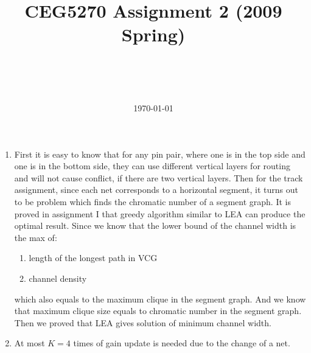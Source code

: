 \documentclass[a4paper,12pt]{article}
\title{CEG5270 Assignment 2 (2009 Spring)}
\author{\myname\\\mymail\\\CSE\\\CUHK}
\date{\today}
\begin{document}
\maketitle
\begin{enumerate}
\item
First it is easy to know that for any pin pair, where one is in the top side and one is in the bottom side,
they can use different vertical layers for routing and will not cause conflict, if there are two vertical layers.
Then for the track assignment, since each net corresponds to a horizontal segment, 
it turns out to be problem which finds the chromatic number of a segment graph.
It is proved in assignment I that greedy algorithm similar to LEA can produce the optimal result.
Since we know that the lower bound of the channel width is the max of:
	\begin{enumerate}
	\item\label{lb1}
	length of the longest path in VCG
	\item\label{lb2}
	channel density
	\end{enumerate}
which also equals to the maximum clique in the segment graph.
And we know that maximum clique size equals to chromatic number in the segment graph.
Then we proved that LEA gives solution of minimum channel width.
\item
At most $K=4$ times of gain update is needed due to the change of a net.


\end{enumerate}
\end{document}
